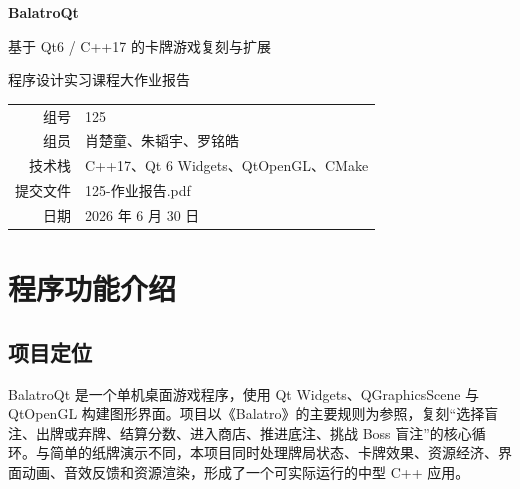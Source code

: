 \documentclass[UTF8,11pt,a4paper]{ctexart}
\begin{document}
\begin{titlepage}
\thispagestyle{empty}
\centering
\vspace*{3.0cm}

{\Huge\bfseries BalatroQt\par}
\vspace{0.6cm}
{\Large 基于 Qt6 / C++17 的卡牌游戏复刻与扩展\par}
\vspace{1.4cm}
{\Large 程序设计实习课程大作业报告\par}

\vspace{2.5cm}
\begin{tabular}{rl}
\toprule
组号 & 125 \\
组员 & 肖楚童、朱韬宇、罗铭皓 \\
技术栈 & C++17、Qt 6 Widgets、QtOpenGL、CMake \\
提交文件 & 125-作业报告.pdf \\
日期 & 2026 年 6 月 30 日 \\
\bottomrule
\end{tabular}

\vfill
\end{titlepage}

\clearpage
{}
\tableofcontents
\newpage

\begin{abstract}
BalatroQt 是一个基于 Qt6/C++17 实现的桌面端卡牌肉鸽游戏项目，目标是在 C++ 环境中复刻并扩展《Balatro》的核心玩法。项目已经实现牌局循环、牌型识别、事件驱动计分、商店经济、补充包、优惠券、标签、赌注、Boss 盲注、收藏图鉴、演示模式等系统，并结合课程内容设计了队列牌组、栈牌组、运算符重载小丑、类模板小丑、迭代器增强和浅拷贝塔罗等原创机制。本文按课程作业报告要求，从程序功能、模块与类设计、小组分工以及项目总结四个方面说明项目成果。

\textbf{关键词：} Qt6；C++17；卡牌游戏；事件驱动计分；面向对象设计；图形界面
\end{abstract}

\section{程序功能介绍}

\subsection{项目定位}

BalatroQt 是一个单机桌面游戏程序，使用 Qt Widgets、QGraphicsScene 与 QtOpenGL 构建图形界面。项目以《Balatro》的主要规则为参照，复刻“选择盲注、出牌或弃牌、结算分数、进入商店、推进底注、挑战 Boss 盲注”的核心循环。与简单的纸牌演示不同，本项目同时处理牌局状态、卡牌效果、资源经济、界面动画、音效反馈和资源渲染，形成了一个可实际运行的中型 C++ 应用。
\end{document}
